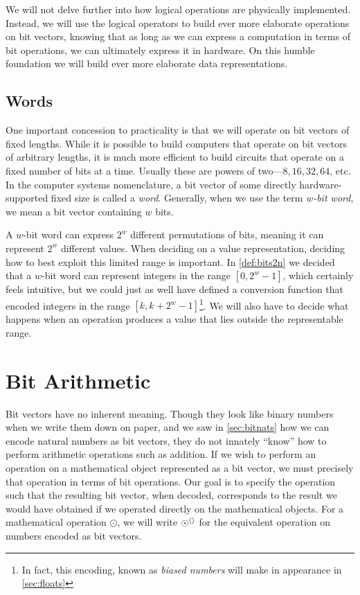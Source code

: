 We will not delve further into how logical operations are physically
implemented.  Instead, we will use the logical operators to build ever
more elaborate operations on bit vectors, knowing that as long as we
can express a computation in terms of bit operations, we can
ultimately express it in hardware.  On this humble foundation we will
build ever more elaborate data representations.

\subsection{Words}
\label{sec:words}

One important concession to practicality is that we will operate on
bit vectors of fixed lengths.  While it is possible to build computers
that operate on bit vectors of arbitrary lengths, it is much more
efficient to build circuits that operate on a fixed number of bits at
a time.  Usually these are powers of two---$8,16,32,64$, etc.  In the
computer systems nomenclature, a bit vector of some directly
hardware-supported fixed size is called a \emph{word}.  Generally,
when we use the term \emph{$w$-bit word}, we mean a bit vector
containing $w$ bits.

A $w$-bit word can express $2^{w}$ different permutations of bits,
meaning it can represent $2^{w}$ different values.  When deciding on a
value representation, deciding how to best exploit this limited range
is important.  In \cref{def:bits2n} we decided that a $w$-bit word can
represent integers in the range $[0,2^{w}-1]$, which certainly feels
intuitive, but we could just as well have defined a conversion
function that encoded integers in the range
$[k,k+2^{w}-1]$\footnote{In fact, this encoding, known as \emph{biased
    numbers} will make in appearance in \cref{sec:floats}}.  We will
also have to decide what happens when an operation produces a value
that lies outside the representable range.

\section{Bit Arithmetic}
\label{sec:bit-arithmetic}

Bit vectors have no inherent meaning.  Though they look like binary
numbers when we write them down on paper, and we saw in
\cref{sec:bitnats} how we can encode natural numbers as bit vectors,
they do not innately ``know'' how to perform arithmetic operations
such as addition.  If we wish to perform an operation on a
mathematical object represented as a bit vector, we must precisely
that operation in terms of bit operations.  Our goal is to specify the
operation such that the resulting bit vector, when decoded,
corresponds to the result we would have obtained if we operated
directly on the mathematical objects.  For a mathematical operation
$\odot$, we will write $\operatorname{\odot^{\langle\rangle}}$ for the equivalent operation on
numbers encoded as bit vectors.

